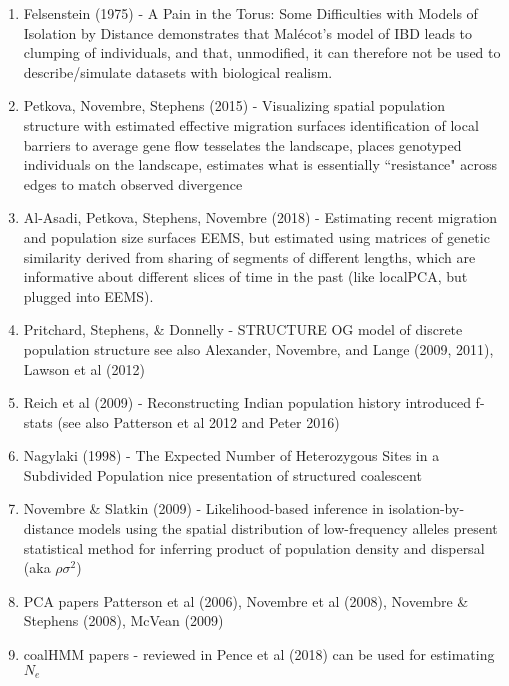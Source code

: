 \documentclass[12pt]{article}
\begin{document}
\begin{enumerate}
\item Felsenstein (1975) - A Pain in the Torus: Some Difficulties with Models of Isolation by Distance
\subitem demonstrates that Mal\'{e}cot's model of IBD leads to clumping of individuals, 
and that, unmodified, it can therefore not be used to describe/simulate datasets with biological realism.

\item Petkova, Novembre, Stephens (2015) - Visualizing spatial population structure with estimated effective migration surfaces
\subitem identification of local barriers to average gene flow
\subitem tesselates the landscape, places genotyped individuals on the landscape, 
estimates what is essentially ``resistance" across edges to match observed divergence

\item Al-Asadi, Petkova, Stephens, Novembre (2018) - Estimating recent migration and population size surfaces
\subitem EEMS, but estimated using matrices of genetic similarity 
derived from sharing of segments of different lengths, 
which are informative about different slices of time in the past 
(like localPCA, but plugged into EEMS).

\item Pritchard, Stephens, \& Donnelly - STRUCTURE
\subitem OG model of discrete population structure 
\subitem see also Alexander, Novembre, and Lange (2009, 2011), Lawson et al (2012)

\item Reich et al (2009) - Reconstructing Indian population history
\subitem introduced f-stats (see also Patterson et al 2012 and Peter 2016)

\item Nagylaki (1998) - The Expected Number of Heterozygous Sites in a Subdivided Population
\subitem nice presentation of structured coalescent

\item Novembre \& Slatkin (2009) - Likelihood-based inference in isolation-by-distance models 
using the spatial distribution of low-frequency alleles
\subitem present statistical method for inferring product of population density and dispersal (aka $\rho\sigma^2$)

\item PCA papers
\subitem Patterson et al (2006), Novembre et al (2008), Novembre \& Stephens (2008), McVean (2009)

\item coalHMM papers - reviewed in Pence et al (2018)
\subitem can be used for estimating $N_e$


\end{enumerate}
\end{document}
